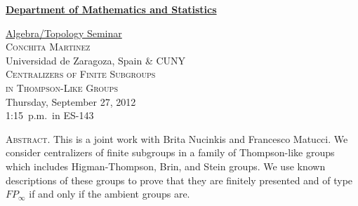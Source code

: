 \documentclass[12pt]{article}
\begin{document}
\noindent\hspace{-28pt}\raisebox{-19pt}{\XeTeXpicfile UAlogo.jpg scaled 340}%
\hfill\textsf{\textbf{\footnotesize\href{http://www.albany.edu/math/}{Department of Mathematics and Statistics}}}\bigskip\bigskip

\begin{center}\Large
  \textsf{\huge \href{http://www.albany.edu/~mv312143/seminar/}{Algebra/Topology Seminar}}\\[2.5\bigskipamount]
  \textsc{\LARGE Conchita Martinez}\\
  Universidad de Zaragoza, Spain \& CUNY\\[1.5\bigskipamount]
  \textsc{\LARGE Centralizers of Finite Subgroups\\ in Thompson-Like Groups}\\[2\bigskipamount]
  Thursday, September 27, 2012\\1:15~p.m.\ in ES-143\\[3\bigskipamount]
\end{center}

\noindent\large\textsc{Abstract.}
This is a joint work with Brita Nucinkis and Francesco Matucci.
We consider centralizers of finite subgroups in a family of Thompson-like groups which includes Higman-Thompson, Brin, and Stein groups. We use known descriptions of these groups to prove that they are finitely presented and of type~$FP_\infty$ if and only if the ambient groups are.
\end{document}
